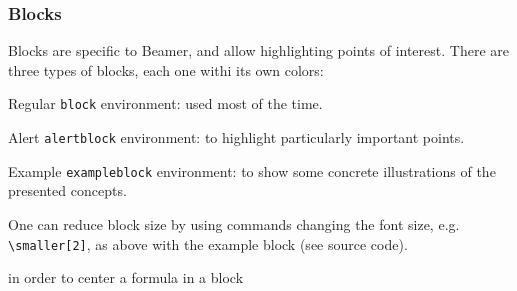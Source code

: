\documentclass[10pt,    %
    english,            %
    xcolor=table,       %
    envcountsect,       %
    aspectratio=43      %
]{beamer}
\begin{document}
\begin{frame}
    \frametitle{Blocks}
    \label{frm:blocks}
    
    Blocks are specific to Beamer, and allow highlighting points of interest. There are three types of blocks, each one withi its own colors:

    \begin{block}{Regular}
        \texttt{block} environment: used most of the time.
    \end{block}

    \begin{alertblock}{Alert}
        \texttt{alertblock} environment: to highlight particularly important points.
    \end{alertblock}

    \begin{exampleblock}{\smaller[2] Example}
        \smaller[2]
        \texttt{exampleblock} environment: to show some concrete illustrations of the presented concepts.
    \end{exampleblock}
    
    One can reduce block size by using commands changing the font size, e.g. \texttt{\textbackslash{}smaller[2]}, as above with the example block (see source code).
    
    in order to center a formula in a block
        
    
    
    
\end{frame}
\end{document}
